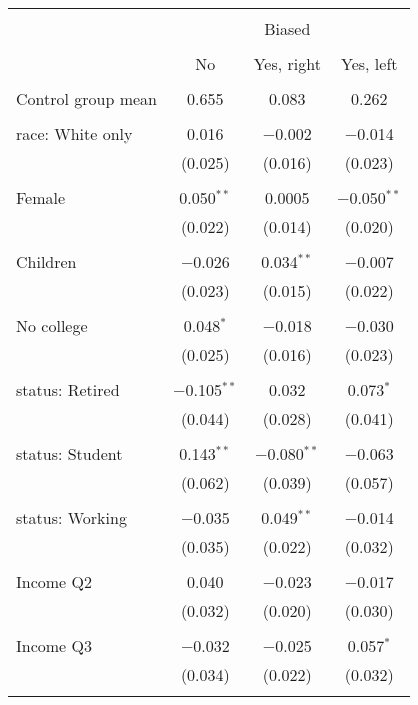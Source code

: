 
\begin{tabular}{@{\extracolsep{5pt}}lccc} 
\\[-1.8ex]\hline 
\hline \\[-1.8ex] 
 & \multicolumn{3}{c}{Biased} \\ 
\cline{2-4} 
\\[-1.8ex] & No & Yes, right & Yes, left \\ 
\hline \\[-1.8ex] 
 Control group mean & 0.655 & 0.083 & 0.262  \\ \hline \\[-1.8ex] race: White only & 0.016 & $-$0.002 & $-$0.014 \\ 
  & (0.025) & (0.016) & (0.023) \\ 
  & & & \\ 
 Female & 0.050$^{**}$ & 0.0005 & $-$0.050$^{**}$ \\ 
  & (0.022) & (0.014) & (0.020) \\ 
  & & & \\ 
 Children & $-$0.026 & 0.034$^{**}$ & $-$0.007 \\ 
  & (0.023) & (0.015) & (0.022) \\ 
  & & & \\ 
 No college & 0.048$^{*}$ & $-$0.018 & $-$0.030 \\ 
  & (0.025) & (0.016) & (0.023) \\ 
  & & & \\ 
 status: Retired & $-$0.105$^{**}$ & 0.032 & 0.073$^{*}$ \\ 
  & (0.044) & (0.028) & (0.041) \\ 
  & & & \\ 
 status: Student & 0.143$^{**}$ & $-$0.080$^{**}$ & $-$0.063 \\ 
  & (0.062) & (0.039) & (0.057) \\ 
  & & & \\ 
 status: Working & $-$0.035 & 0.049$^{**}$ & $-$0.014 \\ 
  & (0.035) & (0.022) & (0.032) \\ 
  & & & \\ 
 Income Q2 & 0.040 & $-$0.023 & $-$0.017 \\ 
  & (0.032) & (0.020) & (0.030) \\ 
  & & & \\ 
 Income Q3 & $-$0.032 & $-$0.025 & 0.057$^{*}$ \\ 
  & (0.034) & (0.022) & (0.032) \\ 
  & & & \\ 

\end{tabular}
